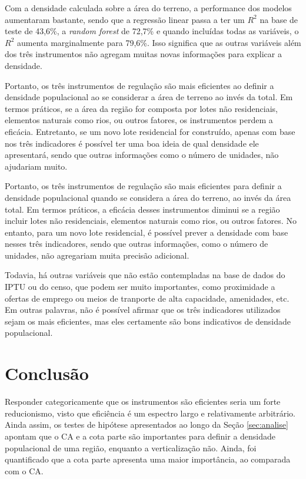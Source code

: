 Com a densidade calculada sobre a área do terreno, a performance dos modelos aumentaram bastante, sendo que a regressão linear passa a ter um $R^2$ na base de teste de 43,6\%, a \textit{random forest} de 72,7\% e quando incluídas todas as variáveis, o $R^2$ aumenta marginalmente para 79,6\%. Isso significa que as outras variáveis além dos três instrumentos não agregam muitas novas informações para explicar a densidade.

Portanto, os três instrumentos de regulação são mais eficientes ao definir a densidade populacional ao se considerar a área de terreno ao invés da total. Em termos práticos, se a área da região for composta por lotes não residenciais, elementos naturais como rios, ou outros fatores, os instrumentos perdem a eficácia. Entretanto, se um novo lote residencial for construído, apenas com base nos três indicadores é possível ter uma boa ideia de qual densidade ele apresentará, sendo que outras informações como o número de unidades, não ajudariam muito. 

Portanto, os três instrumentos de regulação são mais eficientes para definir a densidade populacional quando se considera a área do terreno, ao invés da área total. Em termos práticos, a eficácia desses instrumentos diminui se a região incluir lotes não residenciais, elementos naturais como rios, ou outros fatores. No entanto, para um novo lote residencial, é possível prever a densidade com base nesses três indicadores, sendo que outras informações, como o número de unidades, não agregariam muita precisão adicional.

Todavia, há outras variáveis que não estão contempladas na base de dados do IPTU ou do censo, que podem ser muito importantes, como proximidade a ofertas de emprego ou meios de tranporte de alta capacidade, amenidades, etc. Em outras palavras, não é possível afirmar que os três indicadores utilizados sejam os mais eficientes, mas eles certamente são bons indicativos de densidade populacional.

\chapter{Conclusão}

Responder categoricamente que os instrumentos são eficientes seria um forte reducionismo, visto que eficiência é um espectro largo e relativamente arbitrário. Ainda assim, os testes de hipótese apresentados ao longo da Seção \ref{sec:analise} apontam que o CA e a cota parte são importantes para definir a densidade populacional de uma região, enquanto a verticalização não. Ainda, foi quantificado que a cota parte apresenta uma maior importância, ao comparada com o CA.

